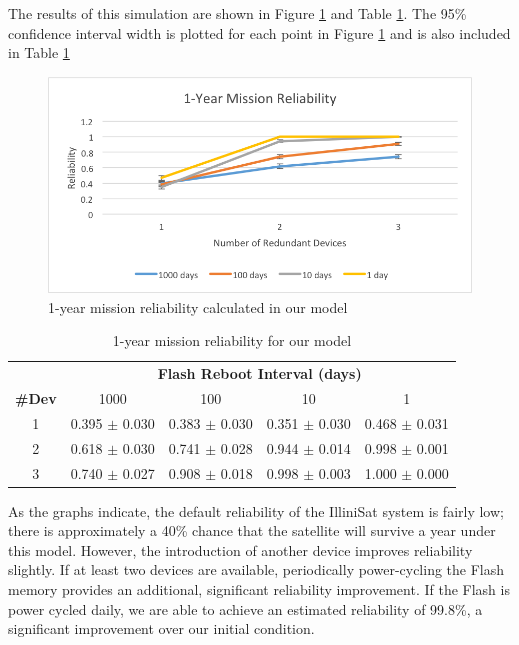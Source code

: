 The results of this simulation are shown in Figure \ref{fig:reliability} and Table \ref{tab:reliability}.  The 95\% confidence interval width is plotted for each point in Figure \ref{fig:reliability} and is also included in Table \ref{tab:reliability}

\begin{figure}[width = 0.5\textwidth]
\centering
\includegraphics[scale=0.6]{reliability}
\caption{1-year mission reliability calculated in  our model}\label{fig:reliability}
\end{figure}

\begin{table}[width = 0.5\textwidth]
{\scriptsize
\centering
\begin{tabular}{ccccc}
\toprule
& \multicolumn{4}{c}{\bf Flash Reboot Interval (days)}\\
\cmidrule(r){2-5}
{\bf \#Dev} & 1000 & 100 & 10 & 1\\
\midrule
1 & 0.395 $\pm$ 0.030 & 0.383 $\pm$ 0.030 & 0.351 $\pm$ 0.030 & 0.468 $\pm$ 0.031 \\
2 & 0.618 $\pm$ 0.030 & 0.741 $\pm$ 0.028 & 0.944 $\pm$ 0.014 & 0.998 $\pm$ 0.001 \\
3 & 0.740 $\pm$ 0.027 & 0.908 $\pm$ 0.018 & 0.998 $\pm$ 0.003 & 1.000 $\pm$ 0.000 \\
\bottomrule
\end{tabular}
\caption{1-year mission reliability for our model}\label{tab:reliability}
}
\end{table}

As the graphs indicate, the default reliability of the IlliniSat system is fairly low; there is approximately a 40\% chance that the satellite will survive a year under this model.  However, the introduction of another device improves reliability slightly.  If at least two devices are available, periodically power-cycling the Flash memory provides an additional, significant reliability improvement.  If the Flash is power cycled daily, we are able to achieve an estimated reliability of 99.8\%, a significant improvement over our initial condition.

